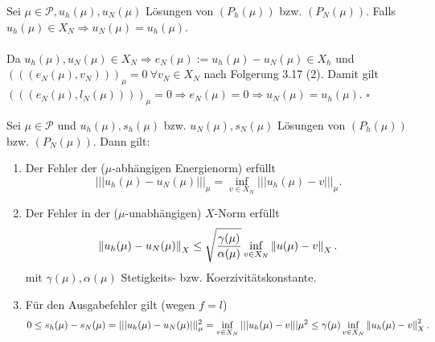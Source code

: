 Sei $\mu\in\mathcal{P},u_h(\mu),u_N(\mu)$ Lösungen von $(P_h(\mu))$ bzw. $(P_N(\mu))$.
Falls $u_h(\mu)\in X_N \Rightarrow u_N(\mu) = u_h(\mu)$.\\

\\
Da $u_h(\mu),u_N(\mu)\in X_N \Rightarrow e_N(\mu) := u_h(\mu) - u_N(\mu)\in X_h$ und $(((e_N(\mu),v_N)))_\mu = 0 ~\forall v_N\in X_N$ nach Folgerung 3.17 (2).
Damit gilt $(((e_N(\mu),l_N(\mu))))_\mu = 0 \Rightarrow e_N(\mu) = 0 \Rightarrow u_N(\mu) = u_h(\mu)$.
\hfill $\square$

Sei $\mu \in \mathcal{P}$ und $ u_h(\mu),s_h(\mu)$ bzw. $u_N(\mu),s_N(\mu)$ Lösungen von $(P_h(\mu))$ bzw. $(P_N(\mu))$.
Dann gilt:
\begin{enumerate}[(1)]
	\item Der Fehler der ($\mu$-abhängigen Energienorm) erfüllt
	\[
	|||u_h(\mu)-u_N(\mu)|||_\mu = \inf\limits_{v\in X_N} |||u_h(\mu)-v|||_\mu.
	\]
	\item Der Fehler in der ($\mu$-unabhängigen) $X$-Norm erfüllt
	\[
	\left\Vert u_h(\mu)-u_N(\mu)\right\Vert_X \le \sqrt{\frac{\gamma(\mu)}{\alpha(\mu)}} \inf\limits_{v\in X_N} \left\Vert u(\mu)-v\right\Vert_X.
	\]
	mit $\gamma(\mu),\alpha(\mu)$ Stetigkeits- bzw. Koerzivitätskonstante.
	\item Für den Ausgabefehler gilt (wegen $f=l$)
	\[
	0\le s_h(\mu)-s_N(\mu) = |||u_h(\mu)-u_N(\mu)|||_\mu^2 = \inf\limits_{v\in X_N} |||u_h(\mu)-v|||\mu^2 \le \gamma(\mu) \inf\limits_{v\in X_N} \left\Vert u_h(\mu)-v\right\Vert_X^2.
	\]
\end{enumerate}

